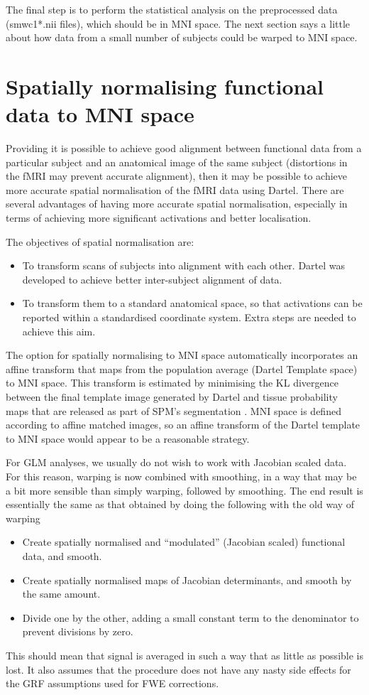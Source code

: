 The final step is to perform the statistical analysis on the preprocessed data (smwc1*.nii files), which should be in MNI space.
The next section says a little about how data from a small number of subjects could be warped to MNI space.



\section{Spatially normalising functional data to MNI space}
Providing it is possible to achieve good alignment between functional data from a particular subject and an anatomical image of the same subject (distortions in the fMRI may prevent accurate alignment), then it may be possible to achieve more accurate spatial normalisation of the fMRI data using Dartel.
There are several advantages of having more accurate spatial normalisation, especially in terms of achieving more significant activations and better localisation.

The objectives of spatial normalisation are:
\begin{itemize}
\item{To transform scans of subjects into alignment with each other.
Dartel was developed to achieve better inter-subject alignment of data.
}
\item{To transform them to a standard anatomical space, so that activations can be reported within a standardised coordinate system.
Extra steps are needed to achieve this aim.
}
\end{itemize}

The option for spatially normalising to MNI space automatically incorporates an affine transform that maps from the population average (Dartel Template space) to MNI space.
This transform is estimated by minimising the KL divergence between the final template image generated by Dartel and tissue probability maps that are released as part of SPM's segmentation \cite{ashburner05}.  MNI space is defined according to affine matched images, so an affine transform of the Dartel template to MNI space would appear to be a reasonable strategy.

For GLM analyses, we usually do not wish to work with Jacobian scaled data.
For this reason, warping is now combined with smoothing, in a way that may be a bit more
sensible than simply warping, followed by smoothing.  The end result is
essentially the same as that obtained by doing the following with the old way of warping
\begin{itemize}
\item{Create spatially normalised and ``modulated'' (Jacobian scaled) functional data, and smooth.}
\item{Create spatially normalised maps of Jacobian determinants, and smooth by the same amount.}
\item{Divide one by the other, adding a small constant term to the denominator to prevent divisions by zero.}
\end{itemize}
This should mean that signal is averaged in such a way that as little as possible
is lost.  It also assumes that the procedure does not have any nasty side
effects for the GRF assumptions used for FWE corrections.


